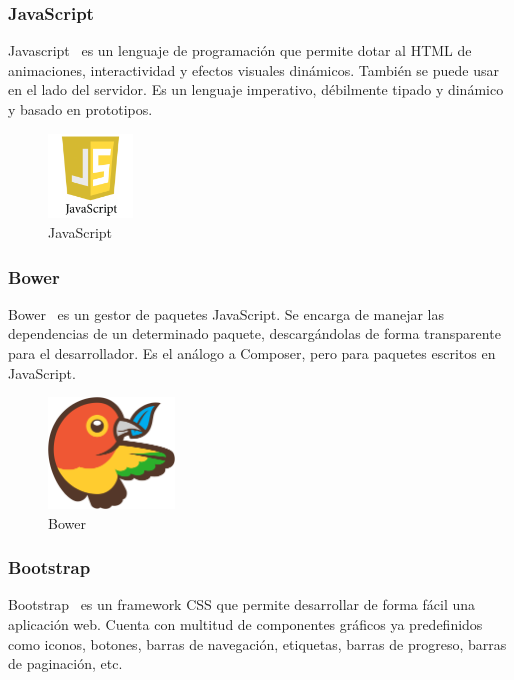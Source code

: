 \subsubsection*{JavaScript}
Javascript~\cite{javascript} es un lenguaje de programación que permite dotar al HTML de animaciones, interactividad y efectos visuales dinámicos. También se puede usar en el lado del servidor. Es un lenguaje imperativo, débilmente tipado y dinámico y basado en prototipos.

\begin{figure}[tbh]
\centering
\label{fig:javascript}
\includegraphics[width=0.2\textwidth]{imagenes/javascript}
\caption{JavaScript}
\end{figure}

\subsubsection*{Bower}
Bower~\cite{bower} es un gestor de paquetes JavaScript. Se encarga de manejar las dependencias de un determinado paquete, descargándolas de forma transparente para el desarrollador. Es el análogo a Composer, pero para paquetes escritos en JavaScript. 

\begin{figure}[tbh]
\centering
\label{fig:bower}
\includegraphics[width=0.3\textwidth]{imagenes/bower}
\caption{Bower}
\end{figure}

\subsubsection*{Bootstrap}
Bootstrap~\cite{bootstrap} es un framework CSS que permite desarrollar de forma fácil una aplicación web. Cuenta con multitud de componentes gráficos ya predefinidos como iconos, botones, barras de navegación, etiquetas, barras de progreso, barras de paginación, etc.

